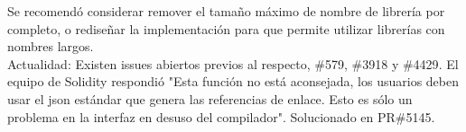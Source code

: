 Se recomendó considerar remover el tamaño máximo de nombre de librería por completo, o rediseñar la implementación para que permite utilizar librerías con nombres largos.\\

Actualidad: Existen issues abiertos previos al respecto, \#579\cite{GHI579}, \#3918\cite{GHI3918} y \#4429\cite{GHI4429}. El equipo de Solidity respondió "Esta función no está aconsejada, los usuarios deben usar el json estándar que genera las referencias de enlace. Esto es sólo un problema en la interfaz en desuso del compilador". Solucionado en PR\#5145\cite{GHPR5145}.